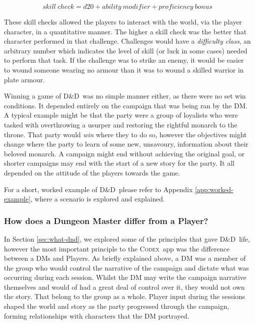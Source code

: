 \documentclass[final]{cmpreport}
\newcommand{\dnd}{D\&D}
\newcommand{\Codex}{\textsc{Codex}}
\begin{document}
			\begin{equation} \label{eq:skill-check}
			skill \ check = d20 + ability \ modifier + proficiency \ bonus
			\end{equation}
			
			These skill checks allowed the players to interact with the world, via the player character, in a quantitative manner. The higher a skill check was the better that character performed in that challenge. Challenges would have a \emph{difficulty class}, an arbitrary number which indicates the level of skill (or luck in some cases) needed to perform that task. If the challenge was to strike an enemy, it would be easier to wound someone wearing no armour than it was to wound a skilled warrior in plate armour. 
			
			Winning a game of \dnd \ was no simple manner either, as there were no set win conditions. It depended entirely on the campaign that was being ran by the DM. A typical example might be that the party were a group of loyalists who were tasked with overthrowing a usurper and restoring the rightful monarch to the throne. That party would \emph{win} where they to do so, however the objectives might change where the party to learn of some new, unsavoury, information about their beloved monarch. A campaign might end without achieving the original goal, or shorter campaigns may end with the start of a new story for the party. It all depended on the attitude of the players towards the game.
			
			For a short, worked example of \dnd \ please refer to Appendix \ref{app:worked-example}, where a scenario is explored and explained. 
			
			\subsubsection{How does a Dungeon Master differ from a Player?} \label{sec:dm-vs-player}
			In Section \ref{sec:what-dnd}, we explored some of the principles that gave \dnd \ life, however the most important principle to the \Codex \ app was the difference between a DMs and Players. As briefly explained above, a DM was a member of the group who would control the narrative of the campaign and dictate what was occurring during each session. Whilst the DM may write the campaign narrative themselves and would of had a great deal of control over it, they would not own the story. That belong to the group as a whole. Player input during the sessions shaped the world and story as the party progressed through the campaign, forming relationships with characters that the DM portrayed. 
			
\end{document}
